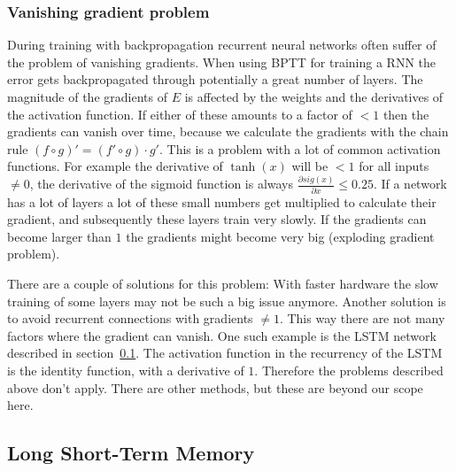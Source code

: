 \subsubsection{Vanishing gradient problem}

During training with backpropagation recurrent neural networks often suffer of the problem of vanishing gradients.
When using BPTT for training a RNN the error gets backpropagated through potentially a great number of layers. The magnitude
of the gradients of $E$ is affected by the weights and the derivatives of the activation function. If either of these amounts
to a factor of $< 1$ then the gradients can vanish over time, because we calculate the gradients with the
chain rule $(f\circ g)'=(f'\circ g)\cdot g'$.
This is a problem with a lot of common activation functions. For example the derivative 
of $\tanh(x)$ will be $< 1$ for all inputs $\neq 0$, 
the derivative of the sigmoid function is always $\frac{\partial sig(x)}{\partial x} \leq 0.25$. 
If a network has a lot of layers a lot of these small numbers get multiplied to calculate their gradient, and subsequently 
these layers train very slowly.
If the gradients can become larger than $1$ the gradients might become very big (exploding gradient problem).

There are a couple of solutions for this problem: With faster hardware the slow training of some layers may not be such a big issue anymore.
Another solution is to avoid recurrent connections with gradients $\neq 1$. This way there are not many factors where the
gradient can vanish. One such example is the LSTM network described in section~\ref{subsec:lstm}. 
The activation function in the recurrency of the LSTM is the identity function, with a derivative of $1$. Therefore the problems described 
above don't apply. There are other methods, but these are beyond our scope here.



\subsection{Long Short-Term Memory}
\label{subsec:lstm}

